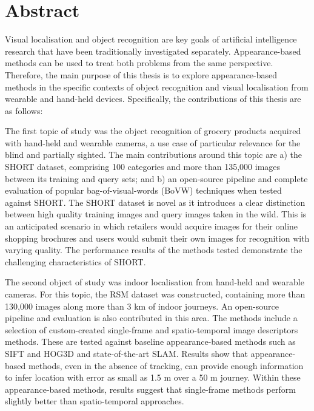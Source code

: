 \begingroup
\let\clearpage\relax
\let\cleardoublepage\relax
\let\cleardoublepage\relax

\chapter*{Abstract}

Visual localisation and object recognition are key goals of artificial intelligence research that have been traditionally investigated separately. Appearance-based methods can be used to treat both problems from the same perspective. Therefore, the main purpose of this thesis is to explore appearance-based methods in the specific contexts of object recognition and visual localisation from wearable and hand-held devices. Specifically, the contributions of this thesis are as follows:

The first topic of study was the object recognition of grocery products acquired with hand-held and wearable cameras, a use case of particular relevance for the blind and partially sighted. The main contributions around this topic are a) the SHORT dataset, comprising 100 categories and more than 135,000 images between its training and query sets; and b) an open-source pipeline and complete evaluation of popular bag-of-visual-words (BoVW) techniques when tested against SHORT. The SHORT dataset is novel as it introduces a clear distinction between high quality training images and query images taken in the wild. This is an anticipated scenario in which retailers would acquire images for their online shopping brochures and users would submit their own images for recognition with varying quality. The performance results of the methods tested demonstrate the challenging characteristics of SHORT.

The second object of study was indoor localisation from hand-held and wearable cameras. For this topic, the RSM dataset was constructed, containing more than 130,000 images along more than 3 km of indoor journeys. An open-source pipeline and evaluation is also contributed in this area. The methods include a selection of custom-created single-frame and spatio-temporal image descriptors methods. These are tested against baseline appearance-based methods such as SIFT and HOG3D and state-of-the-art SLAM. Results show that appearance-based methods, even in the absence of tracking, can provide enough information to infer location with error as small as 1.5 m over a 50 m journey. Within these appearance-based methods, results suggest that single-frame methods perform slightly better than spatio-temporal approaches.

